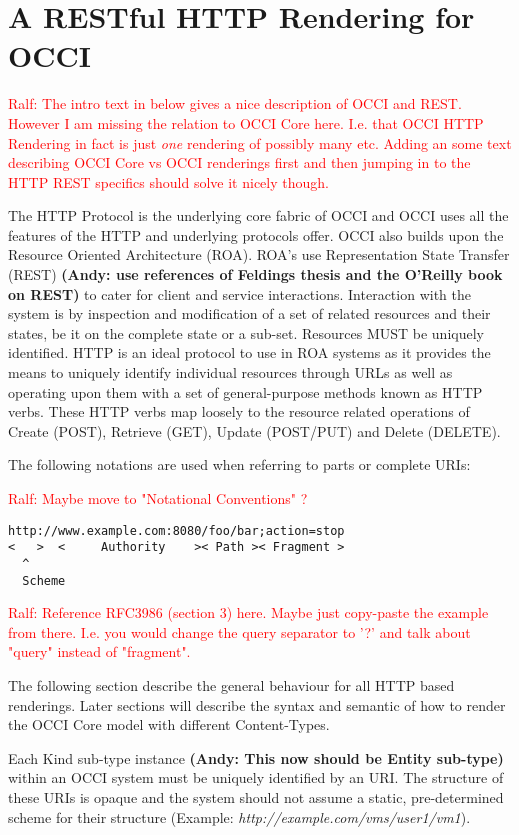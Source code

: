 \documentclass[10pt,a4paper]{article}
\newcommand{\ralf}[1]{\textcolor{red}{Ralf: #1}}
\begin{document}
\section{A RESTful HTTP Rendering for OCCI}

\ralf{The intro text in below gives a nice description of OCCI and REST.
However I am missing the relation to OCCI Core here. I.e. that OCCI HTTP
Rendering in fact is just {\em one} rendering of possibly many etc. Adding an some
text describing OCCI Core vs OCCI renderings first and then jumping in to the
HTTP REST specifics should solve it nicely though.}
	 
The HTTP Protocol is the underlying core fabric of OCCI and OCCI uses all
the features of the HTTP and underlying protocols offer. 
OCCI also builds upon the Resource Oriented Architecture (ROA). 
ROA's use Representation State Transfer
(REST) \textbf{(Andy: use references of Feldings thesis and the O'Reilly book on REST)} 
to cater for client and service interactions. Interaction with
the system is by inspection and modification of a set of related
resources and their states, be it on the complete state or a
sub-set. Resources MUST be uniquely identified. HTTP is an ideal
protocol to use in ROA systems as it provides the means to uniquely
identify individual resources through URLs as well as operating upon
them with a set of general-purpose methods known as HTTP verbs. These HTTP verbs map
loosely to the resource related operations of Create (POST), Retrieve
(GET), Update (POST/PUT) and Delete (DELETE).

The following notations are used when referring to parts or complete
URIs:

\ralf{Maybe move to "Notational Conventions" ?}

\begin{verbatim}
http://www.example.com:8080/foo/bar;action=stop
<   >  <     Authority    >< Path >< Fragment >
  ^
  Scheme
\end{verbatim}

\ralf{Reference RFC3986 (section 3) here. Maybe just copy-paste the example
from there. I.e. you would change the query separator to '?' and talk about
"query" instead of "fragment".}

The following section describe the general behaviour for all HTTP based
renderings. Later sections will describe the syntax and semantic of
how to render the OCCI Core model with different Content-Types.

Each Kind sub-type instance \textbf{(Andy: This now should be Entity sub-type)} 
within an OCCI system must be uniquely
identified by an URI. The structure of these URIs is opaque and the
system should not assume a static, pre-determined scheme for their
structure (Example: \emph{http://example.com/vms/user1/vm1}).
\end{document}
